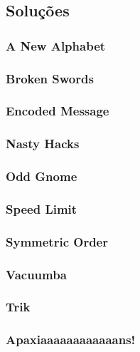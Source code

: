 \documentclass[hidelinks]{article}
\begin{document}
        \subsection{Soluções}
            \subsubsection{A New Alphabet}
                
            \subsubsection{Broken Swords}
                
            \subsubsection{Encoded Message}
                
            \subsubsection{Nasty Hacks}
                
            \subsubsection{Odd Gnome}
                
            \subsubsection{Speed Limit}
                
            \subsubsection{Symmetric Order}
                
            \subsubsection{Vacuumba}
                
            \subsubsection{Trik}
                
            \subsubsection{Apaxiaaaaaaaaaaaans!}
                
    
\end{document}
